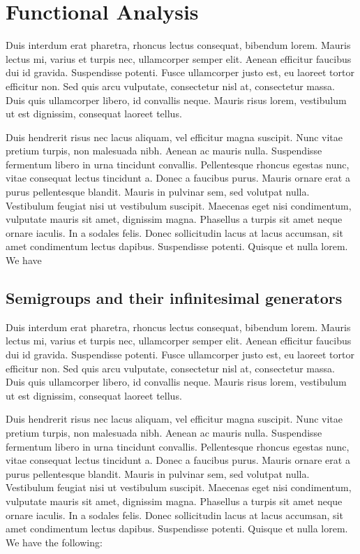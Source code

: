 \documentclass{article}
\begin{document}
\section{Functional Analysis}
Duis interdum erat pharetra, rhoncus lectus consequat, bibendum lorem. Mauris lectus mi, varius et turpis nec, ullamcorper semper elit. Aenean efficitur faucibus dui id gravida. Suspendisse potenti. Fusce ullamcorper justo est, eu laoreet tortor efficitur non. Sed quis arcu vulputate, consectetur nisl at, consectetur massa. Duis quis ullamcorper libero, id convallis neque. Mauris risus lorem, vestibulum ut est dignissim, consequat laoreet tellus.

Duis hendrerit risus nec lacus aliquam, vel efficitur magna suscipit. Nunc vitae pretium turpis, non malesuada nibh. Aenean ac mauris nulla. Suspendisse fermentum libero in urna tincidunt convallis. Pellentesque rhoncus egestas nunc, vitae consequat lectus tincidunt a. Donec a faucibus purus. Mauris ornare erat a purus pellentesque blandit. Mauris in pulvinar sem, sed volutpat nulla. Vestibulum feugiat nisi ut vestibulum suscipit. Maecenas eget nisi condimentum, vulputate mauris sit amet, dignissim magna. Phasellus a turpis sit amet neque ornare iaculis. In a sodales felis. Donec sollicitudin lacus at lacus accumsan, sit amet condimentum lectus dapibus. Suspendisse potenti. Quisque et nulla lorem. We have

\subsection{Semigroups and their infinitesimal generators}
\noindent Duis interdum erat pharetra, rhoncus lectus consequat, bibendum lorem. Mauris lectus mi, varius et turpis nec, ullamcorper semper elit. Aenean efficitur faucibus dui id gravida. Suspendisse potenti. Fusce ullamcorper justo est, eu laoreet tortor efficitur non. Sed quis arcu vulputate, consectetur nisl at, consectetur massa. Duis quis ullamcorper libero, id convallis neque. Mauris risus lorem, vestibulum ut est dignissim, consequat laoreet tellus.

Duis hendrerit risus nec lacus aliquam, vel efficitur magna suscipit. Nunc vitae pretium turpis, non malesuada nibh. Aenean ac mauris nulla. Suspendisse fermentum libero in urna tincidunt convallis. Pellentesque rhoncus egestas nunc, vitae consequat lectus tincidunt a. Donec a faucibus purus. Mauris ornare erat a purus pellentesque blandit. Mauris in pulvinar sem, sed volutpat nulla. Vestibulum feugiat nisi ut vestibulum suscipit. Maecenas eget nisi condimentum, vulputate mauris sit amet, dignissim magna. Phasellus a turpis sit amet neque ornare iaculis. In a sodales felis. Donec sollicitudin lacus at lacus accumsan, sit amet condimentum lectus dapibus. Suspendisse potenti. Quisque et nulla lorem. We have the following:
\end{document}
